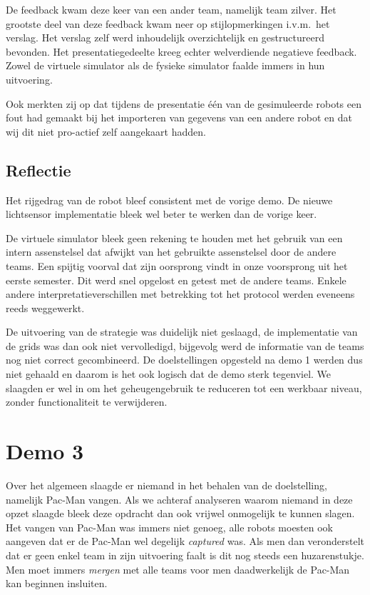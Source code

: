 \documentclass[12pt,a4paper]{report}
\begin{document}
De feedback kwam deze keer van een ander team, namelijk team zilver. Het grootste deel van deze feedback kwam neer op stijlopmerkingen i.v.m.\ het verslag. Het verslag zelf werd inhoudelijk overzichtelijk en gestructureerd bevonden. Het presentatiegedeelte kreeg echter welverdiende negatieve feedback. Zowel de virtuele simulator als de fysieke simulator faalde immers in hun uitvoering.

Ook merkten zij op dat tijdens de presentatie \'e\'en van de gesimuleerde robots een fout had gemaakt bij het importeren van gegevens van een andere robot en dat wij dit niet pro-actief zelf aangekaart hadden. 

\subsection{Reflectie}

Het rijgedrag van de robot bleef consistent met de vorige demo. De nieuwe lichtsensor implementatie bleek wel beter te werken dan de vorige keer.

De virtuele simulator bleek geen rekening te houden met het gebruik van een intern assenstelsel dat afwijkt van het gebruikte assenstelsel door de andere teams. Een spijtig voorval dat zijn oorsprong vindt in onze voorsprong uit het eerste semester. Dit werd snel opgelost en getest met de andere teams. Enkele andere interpretatieverschillen met betrekking tot het protocol werden eveneens reeds weggewerkt.

De uitvoering van de strategie was duidelijk niet geslaagd, de implementatie van de grids was dan ook niet vervolledigd, bijgevolg werd de informatie van de teams nog niet correct gecombineerd.
De doelstellingen opgesteld na demo 1 werden dus niet gehaald en daarom is het ook logisch dat de demo sterk tegenviel. We slaagden er wel in om het geheugengebruik te reduceren tot een werkbaar niveau, zonder functionaliteit te verwijderen.

\section{Demo 3}

Over het algemeen slaagde er niemand in het behalen van de doelstelling, namelijk Pac-Man vangen. Als we achteraf analyseren waarom niemand in deze opzet slaagde bleek deze opdracht dan ook vrijwel onmogelijk te kunnen slagen. Het vangen van Pac-Man was immers niet genoeg, alle robots moesten ook aangeven dat er de Pac-Man wel degelijk \emph{captured} was. Als men dan veronderstelt dat er geen enkel team in zijn uitvoering faalt is dit nog steeds een huzarenstukje. Men moet immers \emph{mergen} met alle teams voor men daadwerkelijk de Pac-Man kan beginnen insluiten.
\end{document}
